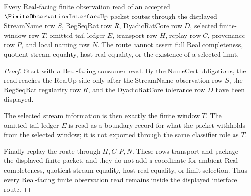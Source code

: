 \begin{theorem}
\label{thm:finite-observation-interface-selected-stream-handoff}
Every Real-facing finite observation read of an accepted $\FiniteObservationInterfaceUp$ packet routes through the displayed StreamName row $S$, RegSeqRat row $R$, DyadicRatCore row $D$, selected finite-window row $T$, omitted-tail ledger $E$, transport row $H$, replay row $C$, provenance row $P$, and local naming row $N$. The route cannot assert full Real completeness, quotient stream equality, host real equality, or the existence of a selected limit.
\end{theorem}
\begin{proof}
Start with a Real-facing consumer read. By the NameCert obligations, the read reaches the RealUp side only after the StreamName observation row $S$, the RegSeqRat regularity row $R$, and the DyadicRatCore tolerance row $D$ have been displayed.

The selected stream information is then exactly the finite window $T$. The omitted-tail ledger $E$ is read as a boundary record for what the packet withholds from the selected window; it is not exported through the same classifier role as $T$.

Finally replay the route through $H,C,P,N$. These rows transport and package the displayed finite packet, and they do not add a coordinate for ambient Real completeness, quotient stream equality, host real equality, or limit selection. Thus every Real-facing finite observation read remains inside the displayed interface route.
\end{proof}


